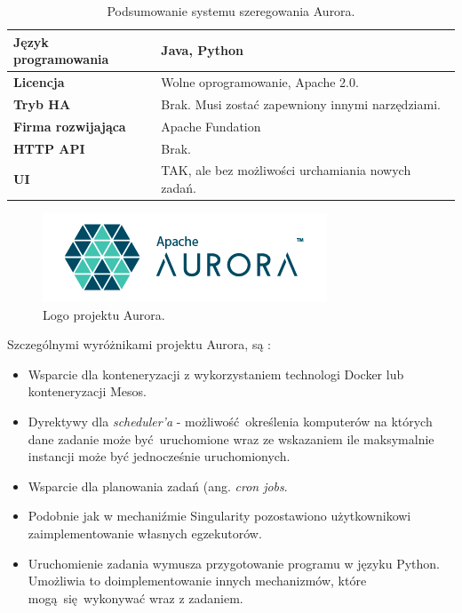 \documentclass[10pt,a4paper,titlepage,twoside]{report}
\begin{document}
\begin{table}[!h]
\caption{Podsumowanie systemu szeregowania Aurora.}
\label{aurora_info}
\centering
\begin{tabular}{|p{4cm}|p{6cm}|}
  \hline
  \textbf{Język programowania} & Java, Python \\
  \hline
  \textbf{Licencja} & Wolne oprogramowanie, Apache 2.0. \\
  \hline
  \textbf{Tryb HA} & Brak. Musi zostać zapewniony innymi narzędziami. \\
  \hline
  \textbf{Firma rozwijająca} & Apache Fundation \\
  \hline
  \textbf{HTTP API} & Brak. \\
  \hline
  \textbf{UI} & TAK, ale bez możliwości urchamiania nowych zadań. \\
  \hline
\end{tabular}
\end{table}

\begin{figure}[!h]
	\centering
	\includegraphics[scale=1]{pics/aurora_logo.png}
	\caption{Logo projektu Aurora.}
	\label{aurora_logo}
\end{figure}

Szczególnymi wyróżnikami projektu Aurora, są \cite{ad41}:
\begin{itemize}
\item Wsparcie dla konteneryzacji z wykorzystaniem technologi Docker lub konteneryzacji Mesos.
\item Dyrektywy dla \textit{scheduler'a} - możliwość określenia komputerów na których dane zadanie może być uruchomione wraz ze wskazaniem ile maksymalnie instancji może być jednocześnie uruchomionych.
\item Wsparcie dla planowania zadań (ang. \textit{cron jobs}.
\item Podobnie jak w mechaniźmie Singularity pozostawiono użytkownikowi zaimplementowanie własnych egzekutorów.
\item Uruchomienie zadania wymusza przygotowanie programu w języku Python. Umożliwia to doimplementowanie innych mechanizmów, które mogą się wykonywać wraz z zadaniem.
\end{itemize}
\end{document}

